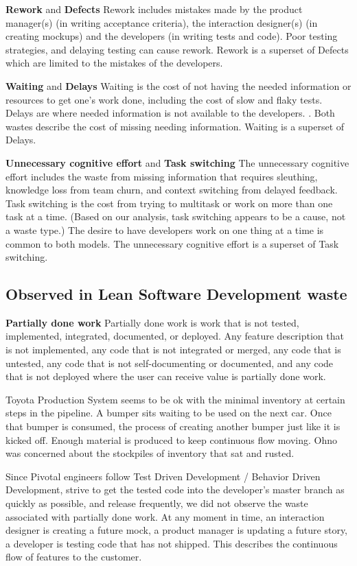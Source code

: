 \textbf{Rework} and \textbf{Defects}
Rework includes mistakes made by the product manager(s) (in writing acceptance criteria), the interaction designer(s) (in creating mockups) and the developers (in writing tests and code). Poor testing strategies, and delaying testing can cause rework. Rework is a superset of Defects which are limited to the mistakes of the developers. 

\textbf{Waiting} and \textbf{Delays}
Waiting is the cost of not having the needed information or resources to get one's work done,  including the cost of slow and flaky tests.  Delays are  where needed information is not available to the developers. \cite{PoppendieckConceptToCash}. Both wastes describe the cost of missing needing information. Waiting is a superset of Delays.

\textbf{Unnecessary cognitive effort} and \textbf{Task switching}
The unnecessary cognitive effort includes the waste from missing information that requires sleuthing, knowledge loss from team churn, and context switching from delayed feedback.
Task switching is the cost from trying to multitask or work on more than one task at a time. (Based on our analysis, task switching appears to be a cause, not a waste type.) The desire to have developers work on one thing at a time is common to both models. The unnecessary cognitive effort is a superset of Task switching.  
\subsection{Observed in Lean Software Development waste}
\textbf{Partially done work}
Partially done work is work that is not tested, implemented, integrated, documented, or deployed. Any feature description that is not implemented, any code that is not integrated or merged, any code that is untested, any code that is not self-documenting or documented, and any code that is not deployed where the user can receive value is partially done work. 

Toyota Production System seems to be ok with the minimal inventory at certain steps in the pipeline. A bumper sits waiting to be used on the next car. Once that bumper is consumed, the process of creating another bumper just like it is kicked off. Enough material is produced to keep continuous flow moving. Ohno was concerned about the stockpiles of inventory that sat and rusted.

Since Pivotal engineers follow Test Driven Development / Behavior Driven Development, strive to get the tested code into the developer's master branch as quickly as possible, and release frequently, we did not observe the waste associated with partially done work. At any moment in time, an interaction designer is creating a future mock, a product manager is updating a future story, a developer is testing code that has not shipped. This describes the continuous flow of features to the customer. 


